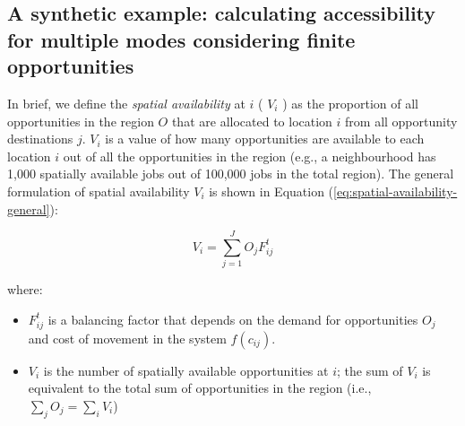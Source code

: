 \documentclass[]{trbunofficial}
\providecommand{\tightlist}{%
  \setlength{\itemsep}{0pt}\setlength{\parskip}{0pt}}
\begin{document}
\hypertarget{a-synthetic-example-calculating-accessibility-for-multiple-modes-considering-finite-opportunities}{%
\subsection{A synthetic example: calculating accessibility for multiple
modes considering finite
opportunities}\label{a-synthetic-example-calculating-accessibility-for-multiple-modes-considering-finite-opportunities}}

In brief, we define the \emph{spatial availability} at \(i\) ( \(V_{i}\)
) as the proportion of all opportunities in the region \(O\) that are
allocated to location \(i\) from all opportunity destinations \(j\).
\(V_{i}\) is a value of how many opportunities are available to each
location \(i\) out of all the opportunities in the region (e.g., a
neighbourhood has 1,000 spatially available jobs out of 100,000 jobs in
the total region). The general formulation of spatial availability
\(V_{i}\) is shown in Equation (\ref{eq:spatial-availability-general}):

\begin{equation}
\label{eq:spatial-availability-general}
V_i = \sum_{j=1}^J O_jF^t_{ij}
\end{equation}

\noindent where:

\begin{itemize}
\tightlist
\item
  \(F^t_{ij}\) is a balancing factor that depends on the demand for
  opportunities \(O_j\) and cost of movement in the system
  \(f(c_{ij})\).
\item
  \(V_i\) is the number of spatially available opportunities at \(i\);
  the sum of \(V_{i}\) is equivalent to the total sum of opportunities
  in the region (i.e., \(\sum_j O_j = \sum_i V_i\))
\end{itemize}
\end{document}
